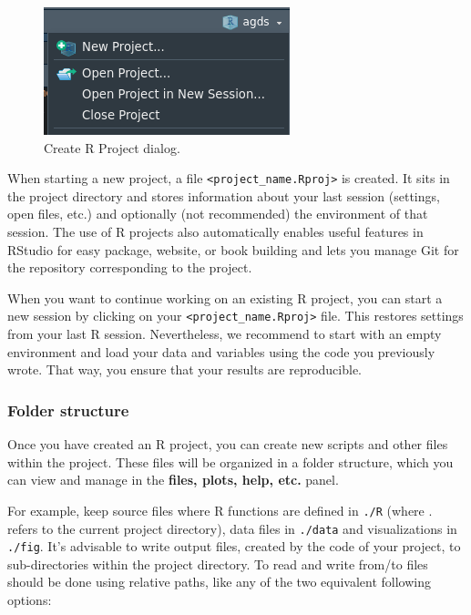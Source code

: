 \documentclass[
]{book}
\begin{document}
\begin{figure}
\centering
\includegraphics{figures/RStudio_RProject_screenshot.png}
\caption{Create R Project dialog.}
\end{figure}

When starting a new project, a file \texttt{\textless{}project\_name.Rproj\textgreater{}} is created. It sits in the project directory and stores information about your last session (settings, open files, etc.) and optionally (not recommended) the environment of that session. The use of R projects also automatically enables useful features in RStudio for easy package, website, or book building and lets you manage Git for the repository corresponding to the project.

When you want to continue working on an existing R project, you can start a new session by clicking on your \texttt{\textless{}project\_name.Rproj\textgreater{}} file. This restores settings from your last R session. Nevertheless, we recommend to start with an empty environment and load your data and variables using the code you previously wrote. That way, you ensure that your results are reproducible.

\hypertarget{folder-structure}{%
\subsubsection{Folder structure}\label{folder-structure}}

Once you have created an R project, you can create new scripts and other files within the project. These files will be organized in a folder structure, which you can view and manage in the \textbf{files, plots, help, etc.} panel.

For example, keep source files where R functions are defined in \texttt{./R} (where . refers to the current project directory), data files in \texttt{./data} and visualizations in \texttt{./fig}. It's advisable to write output files, created by the code of your project, to sub-directories within the project directory. To read and write from/to files should be done using relative paths, like any of the two equivalent following options:
\end{document}
